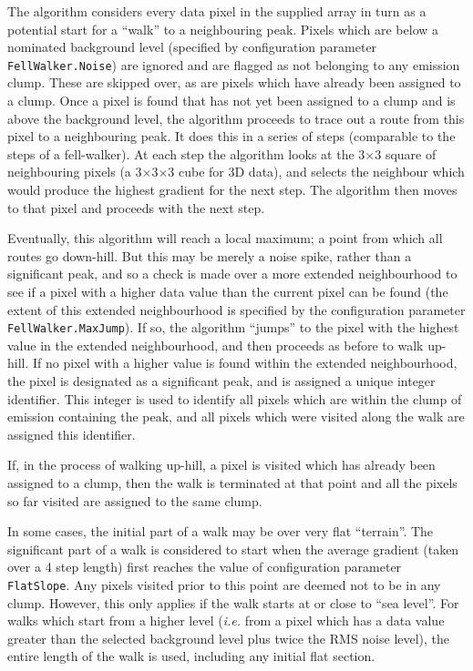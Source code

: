 \documentclass[twoside,11pt]{article}
\renewcommand{\_}{\texttt{\symbol{95}}}
\begin{document}
The algorithm considers every data pixel in the supplied array in turn as
a potential start for a ``walk'' to a neighbouring peak. Pixels which are
below a nominated background level (specified by configuration parameter
{\tt FellWalker.Noise}) are ignored and are flagged as not belonging to any
emission clump. These are skipped over, as are pixels which have already
been assigned to a clump. Once a pixel is found that has not yet been
assigned to a clump and is above the background level, the algorithm
proceeds to trace out a route from this pixel to a neighbouring peak. It
does this in a series of steps (comparable to the steps of a
fell-walker). At each step the algorithm looks at the 3$\times$3 square of
neighbouring pixels (a 3$\times$3$\times$3 cube for 3D data), and selects the
neighbour which would produce the highest gradient for the next step. The
algorithm then moves to that pixel and proceeds with the next step.

Eventually, this algorithm will reach a local maximum; a point from which
all routes go down-hill. But this may be merely a noise spike, rather
than a significant peak, and so a check is made over a more extended
neighbourhood to see if a pixel with a higher data value than the current
pixel can be found (the extent of this extended neighbourhood is
specified by the configuration parameter {\tt FellWalker.MaxJump}). If so, the
algorithm ``jumps'' to the pixel with the highest value in the extended
neighbourhood, and then proceeds as before to walk up-hill. If no pixel
with a higher value is found within the extended neighbourhood, the pixel
is designated as a significant peak, and is assigned a unique integer
identifier. This integer is used to identify all pixels which are within
the clump of emission containing the peak, and all pixels which were
visited along the walk are assigned this identifier.

If, in the process of walking up-hill, a pixel is visited which has
already been assigned to a clump, then the walk is terminated at that
point and all the pixels so far visited are assigned to the same clump.

In some cases, the initial part of a walk may be over very flat
``terrain''. The significant part of a walk is considered to start when
the average gradient (taken over a 4 step length) first reaches the value
of configuration parameter {\tt FlatSlope}. Any pixels visited prior to this point
are deemed not to be in any clump. However, this only applies if the
walk starts at or close to ``sea level''. For walks which start from a
higher level (\emph{i.e.} from a pixel which has a data value greater than
the selected background level plus twice the RMS noise level), the entire
length of the walk is used, including any initial flat section.
\end{document}
